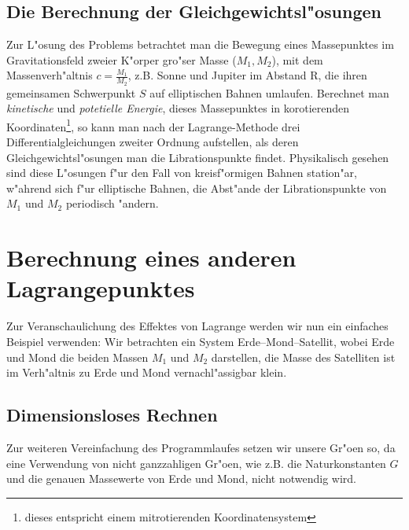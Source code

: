 \subsection{Die Berechnung der Gleichgewichtsl"osungen}
 Zur L"osung des Problems betrachtet man die Bewegung eines Massepunktes im
Gravitationsfeld zweier K"orper gro"ser Masse ($M_1, M_2$), mit dem Massenverh"altnis
$c=\frac{M_1}{M_2}$, z.B. Sonne und Jupiter im Abstand R, die ihren gemeinsamen
Schwerpunkt $S$ auf elliptischen Bahnen umlaufen. Berechnet man {\it kinetische} und
{\it potetielle Energie}, dieses Massepunktes in korotierenden
Koordinaten\footnote{dieses entspricht einem mitrotierenden Koordinatensystem}, so
kann man nach der Lagrange-Methode drei Differentialgleichungen zweiter Ordnung
aufstellen, als deren Gleichgewichtsl"osungen man die Librationspunkte findet.
Physikalisch gesehen sind diese L"osungen f"ur den Fall von kreis\-f"or\-mi\-gen
Bahnen station"ar, w"ahrend sich f"ur elliptische Bahnen, die Abst"ande der
Librationspunkte von $M_1$ und $M_2$ periodisch "andern.

\section{Berechnung eines anderen Lagrangepunktes}
Zur Veranschaulichung des Effektes von Lagrange werden wir nun ein einfaches Beispiel
verwenden:
Wir betrachten ein System Erde--Mond--Satellit, wobei Erde und Mond die beiden Massen
$M_1$ und $M_2$ darstellen, die Masse des Satelliten ist im Verh"altnis zu Erde und
Mond vernachl"assigbar klein.

\subsection{Dimensionsloses Rechnen}
Zur weiteren Vereinfachung des Programmlaufes setzen wir unsere Gr"o\3en so, da\3
eine Verwendung von nicht ganzzahligen Gr"o\3en, wie z.B. die Naturkonstanten $G$ und
die genauen Massewerte von Erde und Mond, nicht notwendig wird. 

